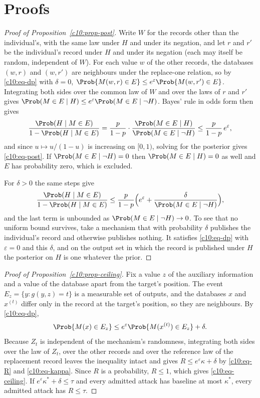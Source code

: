 \section{Proofs}

\begin{proof}[Proof of Proposition~\ref{c10:prop-post}]
Write $W$ for the records other than the individual's, with the same law under
$H$ and under its negation, and let $r$ and $r'$ be the individual's record under
$H$ and under its negation (each may itself be random, independent of $W$). For
each value $w$ of the other records, the databases $(w, r)$ and $(w, r')$ are
neighbours under the replace-one relation, so by \eqref{c10:eq-dp} with
$\delta = 0$, $\Prob\{M(w,r) \in E\} \le e^\varepsilon \Prob\{M(w,r') \in E\}$.
Integrating both sides over the common law of $W$ and over the laws of $r$ and
$r'$ gives
$\Prob(M \in E \mid H) \le e^\varepsilon \Prob(M \in E \mid \neg H)$. Bayes' rule
in odds form then gives
\[
\frac{\Prob(H \mid M \in E)}{1 - \Prob(H \mid M \in E)}
= \frac{p}{1-p}\cdot\frac{\Prob(M \in E \mid H)}{\Prob(M \in E \mid \neg H)}
\le \frac{p}{1-p}\,e^{\varepsilon},
\]
and since $u \mapsto u/(1-u)$ is increasing on $[0,1)$, solving for the posterior
gives \eqref{c10:eq-post}. If $\Prob(M \in E \mid \neg H) = 0$ then
$\Prob(M \in E \mid H) = 0$ as well and $E$ has probability zero, which is
excluded.

For $\delta > 0$ the same steps give
\[
\frac{\Prob(H \mid M \in E)}{1 - \Prob(H \mid M \in E)}
\le \frac{p}{1-p}\Bigl(e^{\varepsilon} + \frac{\delta}{\Prob(M \in E \mid \neg H)}\Bigr),
\]
and the last term is unbounded as $\Prob(M \in E \mid \neg H) \to 0$. To see that
no uniform bound survives, take a mechanism that with probability $\delta$
publishes the individual's record and otherwise publishes nothing. It satisfies
\eqref{c10:eq-dp} with $\varepsilon = 0$ and this $\delta$, and on the output set
in which the record is published under $H$ the posterior on $H$ is one whatever the
prior.
\end{proof}

\begin{proof}[Proof of Proposition~\ref{c10:prop-ceiling}]
Fix a value $z$ of the auxiliary information and a value of the database apart from
the target's position. The event $E_z = \{y : g(y, z) = t\}$ is a measurable set
of outputs, and the databases $x$ and $x^{(t)}$ differ only in the record at the
target's position, so they are neighbours. By \eqref{c10:eq-dp},
\[
\Prob\{M(x) \in E_z\} \le e^{\varepsilon}\Prob\{M(x^{(t)}) \in E_z\} + \delta .
\]
Because $Z_t$ is independent of the mechanism's randomness, integrating both sides
over the law of $Z_t$, over the other records and over the reference law of the
replacement record leaves the inequality intact and gives
$R \le e^{\varepsilon}\kappa + \delta$ by \eqref{c10:eq-R} and
\eqref{c10:eq-kappa}. Since $R$ is a probability, $R \le 1$, which gives
\eqref{c10:eq-ceiling}. If $e^{\varepsilon}\kappa^\ast + \delta \le \tau$ and every
admitted attack has baseline at most $\kappa^\ast$, every admitted attack has
$R \le \tau$.
\end{proof}


